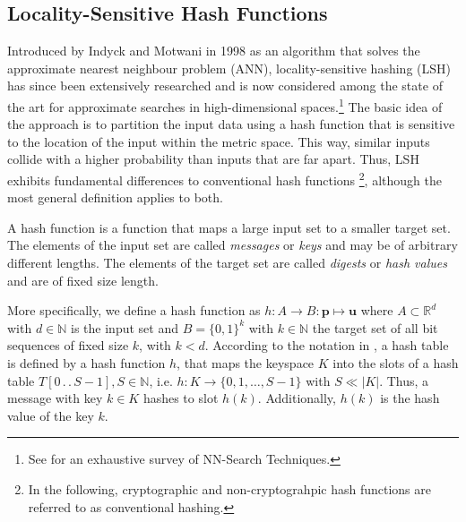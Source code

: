 \subsection{Locality-Sensitive Hash Functions} \label{subsec:locality-sensitive-hashes}

Introduced by Indyck and Motwani in 1998 \cite{indyk_approximate_1998} as an algorithm that solves the approximate nearest neighbour problem (ANN), locality-sensitive hashing (LSH) has since been extensively researched and is now considered among the state of the art for approximate searches in high-dimensional spaces.\footnote{See \cite{nagarkar2021exploring} for an exhaustive survey of NN-Search Techniques.} The basic idea of the approach is to partition the input data using a hash function that is sensitive to the location of the input within the metric space. This way, similar inputs collide with a higher probability than inputs that are far apart. Thus, LSH exhibits fundamental differences to conventional hash functions \footnote{In the following, cryptographic and non-cryptograhpic hash functions are referred to as conventional hashing.}, although the most general definition applies to both.

A hash function is a function that maps a large input set to a smaller target set. The elements of the input set are called \textit{messages} or \textit{keys} and may be of arbitrary different lengths. The elements of the target set are called \textit{digests} or \textit{hash values} and are of fixed size length.

More specifically, we define a hash function as $h: A \rightarrow B : \bm{p} \mapsto \bm{u}$ where $A \subset \mathbb{R}^d$ with $d \in \mathbb{N}$ is the input set and $B=\{0, 1\}^k$ with $k \in \mathbb{N}$ the target set of all bit sequences of fixed size $k$, with $k < d$. According to the notation in \cite[256]{cormen2022introduction}, a hash table is defined by a hash function $h$, that maps the keyspace $K$ into the slots of a hash table $T[0 \,.\,.\, S-1], S \in \mathbb{N}$, i.e. $h: K \rightarrow \{0, 1, \dots, S-1\}$ with $S \ll |K|$. Thus, a message with key $k \in K$ hashes to slot $h(k)$. Additionally, $h(k)$ is the hash value of the key $k$.

